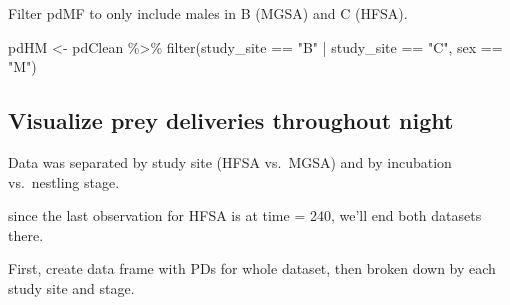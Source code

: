 \documentclass[
]{article}
\newenvironment{Shaded}{\begin{snugshade}}{\end{snugshade}}
\newcommand{\FunctionTok}[1]{\textcolor[rgb]{0.00,0.00,0.00}{#1}}
\newcommand{\NormalTok}[1]{#1}
\newcommand{\OtherTok}[1]{\textcolor[rgb]{0.56,0.35,0.01}{#1}}
\newcommand{\SpecialCharTok}[1]{\textcolor[rgb]{0.00,0.00,0.00}{#1}}
\newcommand{\StringTok}[1]{\textcolor[rgb]{0.31,0.60,0.02}{#1}}
\begin{document}
Filter pdMF to only include males in B (MGSA) and C (HFSA).

\begin{Shaded}
\begin{Highlighting}[]
\NormalTok{pdHM }\OtherTok{\textless{}{-}}\NormalTok{ pdClean }\SpecialCharTok{\%\textgreater{}\%}
  \FunctionTok{filter}\NormalTok{(study\_site }\SpecialCharTok{==} \StringTok{"B"} \SpecialCharTok{|}\NormalTok{ study\_site }\SpecialCharTok{==} \StringTok{"C"}\NormalTok{, sex }\SpecialCharTok{==} \StringTok{"M"}\NormalTok{)}
\end{Highlighting}
\end{Shaded}

\hypertarget{visualize-prey-deliveries-throughout-night}{%
\subsection{Visualize prey deliveries throughout
night}\label{visualize-prey-deliveries-throughout-night}}

Data was separated by study site (HFSA vs.~MGSA) and by incubation
vs.~nestling stage.

since the last observation for HFSA is at time = 240, we'll end both
datasets there.

First, create data frame with PDs for whole dataset, then broken down by
each study site and stage.
\end{document}
